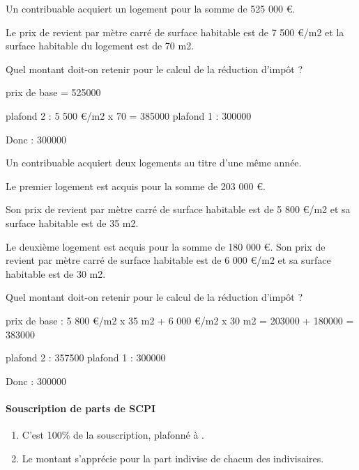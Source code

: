 			\begin{casPratique}{%
				Un contribuable acquiert un logement pour la somme de 525 000 €.

				Le prix de revient par mètre carré de surface habitable est de 7 500 €/m2 et la surface habitable du logement est de 70 m2.

				Quel montant doit-on retenir pour le calcul de la réduction d’impôt ?
				}
				prix de base = 525000

				plafond 2  : 5 500 €/m2 x 70 = 385000
				plafond 1  : 300000

				Donc : 300000

			\end{casPratique}

			\begin{casPratique}{%
				Un contribuable acquiert deux logements au titre d'une même année.

				Le premier logement est acquis pour la somme de 203 000 €.

				Son prix de revient par mètre carré de surface habitable est de 5 800 €/m2 et sa surface habitable est de 35 m2.

				Le deuxième logement est acquis pour la somme de 180 000 €. Son prix de revient par mètre carré de surface habitable est de 6 000 €/m2 et sa surface habitable est de 30 m2.

				Quel montant doit-on retenir pour le calcul de la réduction d’impôt ?
				}

				prix de base  : 5 800 €/m2 x 35 m2 + 6 000 €/m2 x 30 m2 = 203000 + 180000 = 383000

				plafond 2 : 357500
				plafond 1 : 300000

				Donc : 300000
			\end{casPratique}


				\paragraph{Souscription de parts de SCPI}

					\begin{enumerate}[label=\alpha*.]
						\item {} C'est 100\% de la souscription, plafonné à .
						\item {} Le montant s'apprécie pour la part indivise de chacun des indivisaires.
					\end{enumerate}
%



